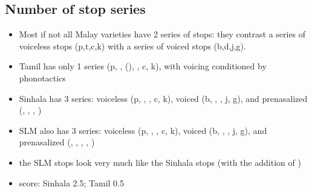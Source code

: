 \documentclass[a4paper,12pt]{article}
\newcommand{\ttrs}[2]{\parbox{3.5cm}{\em \textbf{#1} \em \\ `#2'}}
\newcommand{\nixbox}{\fbox{\parbox{2cm}{~ \\ ~}}}
\begin{document}
\subsection{Number of stop series}
\begin{itemize}
 \item Most if not all Malay varieties have 2 series of stops: they contrast a series of voiceless stops (p,t,c,k) with a series of  voiced stops (b,d,j,g).
 \item Tamil has only 1 series (p, \dentt, (), \tz, c, k), with voicing conditioned by phonotactics
 \item Sinhala has 3 series: voiceless (p, \dentt, \tz, c, k), voiced (b, \dentd, \dz, j, g), and prenasalized (\umb, \undentd, \undz,  \ung)
 \item SLM also has 3 series: voiceless (p, \dentt, \tz, c, k), voiced (b, \dentd, \dz, j, g), and prenasalized (\umb, \undentd, \undz, \unj, \ung)
\item the SLM stops look very much like the Sinhala stops (with the addition of \unj)
\item score: Sinhala 2.5; Tamil 0.5
\end{itemize}
%
%
%
\end{document}
